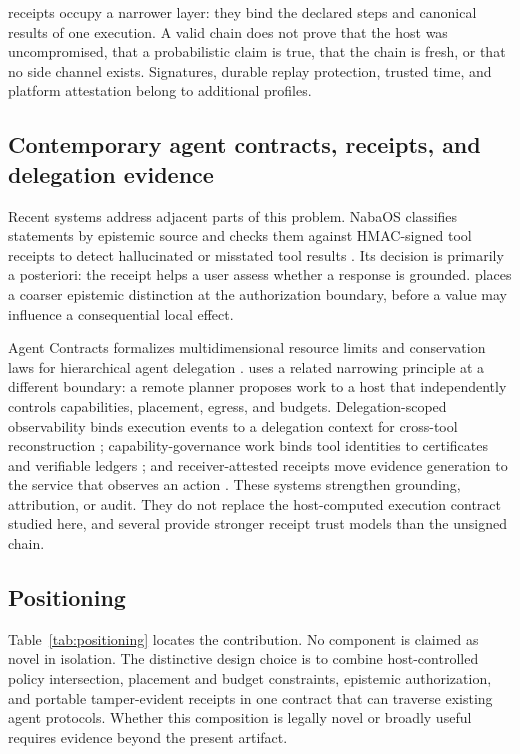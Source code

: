 \AUEC receipts occupy a narrower layer: they bind the declared steps and canonical results of one execution. A valid chain does not prove that the host was uncompromised, that a probabilistic claim is true, that the chain is fresh, or that no side channel exists. Signatures, durable replay protection, trusted time, and platform attestation belong to additional profiles.

\subsection{Contemporary agent contracts, receipts, and delegation evidence}
Recent systems address adjacent parts of this problem. NabaOS classifies statements by epistemic source and checks them against HMAC-signed tool receipts to detect hallucinated or misstated tool results \cite{Basu2026}. Its decision is primarily a posteriori: the receipt helps a user assess whether a response is grounded. \AUEC places a coarser epistemic distinction at the authorization boundary, before a value may influence a consequential local effect.

Agent Contracts formalizes multidimensional resource limits and conservation laws for hierarchical agent delegation \cite{YeTan2026}. \AUEC uses a related narrowing principle at a different boundary: a remote planner proposes work to a host that independently controls capabilities, placement, egress, and budgets. Delegation-scoped observability binds execution events to a delegation context for cross-tool reconstruction \cite{MishraSharad2026}; capability-governance work binds tool identities to certificates and verifiable ledgers \cite{Zhou2026}; and receiver-attested receipts move evidence generation to the service that observes an action \cite{Figuera2026}. These systems strengthen grounding, attribution, or audit. They do not replace the host-computed execution contract studied here, and several provide stronger receipt trust models than the unsigned \Uzero chain.

\subsection{Positioning}
Table~\ref{tab:positioning} locates the contribution. No component is claimed as novel in isolation. The distinctive design choice is to combine host-controlled policy intersection, placement and budget constraints, epistemic authorization, and portable tamper-evident receipts in one contract that can traverse existing agent protocols. Whether this composition is legally novel or broadly useful requires evidence beyond the present artifact.

